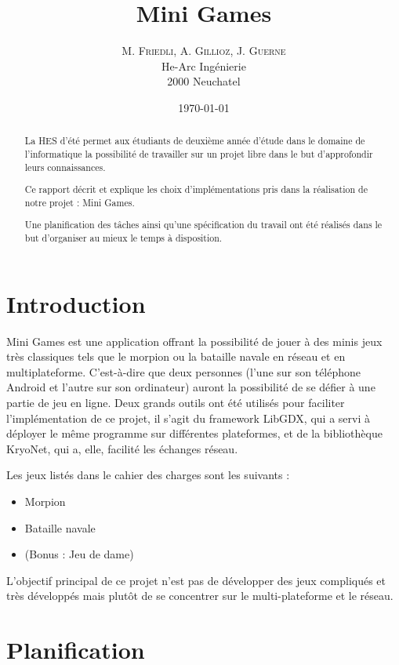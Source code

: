\documentclass{report}
\title{Mini Games}
\author{M. \textsc{Friedli}, A. \textsc{Gillioz}, J. \textsc{Guerne}\\
He-Arc Ingénierie\\
2000 Neuchatel}
\date{\today{}}
\begin{document}
\maketitle{}

\begin{abstract}
La HES d'été permet aux étudiants de deuxième année d'étude dans le domaine de l'informatique
la possibilité de travailler sur un projet libre dans le but d'approfondir leurs connaissances.

Ce rapport décrit et explique les choix d'implémentations pris dans la réalisation de notre
projet : Mini Games.

Une planification des tâches ainsi qu'une spécification du travail ont été réalisés dans le but
d'organiser au mieux le temps à disposition.
\end{abstract}
\tableofcontents

\chapter{Introduction}
Mini Games est une application offrant la possibilité de jouer à des minis jeux très classiques tels
que le morpion ou la bataille navale en réseau et en multiplateforme. C'est-à-dire que deux personnes
(l'une sur son téléphone Android et l'autre sur son ordinateur) auront la possibilité de se défier à une partie de jeu en ligne.
Deux grands outils ont été utilisés pour faciliter l'implémentation de ce projet, il s'agit du framework LibGDX, qui a servi à
déployer le même programme sur différentes plateformes, et de la bibliothèque KryoNet, qui a, elle, facilité les échanges réseau.

Les jeux listés dans le cahier des charges sont les suivants :
\begin{itemize}
	\item Morpion
	\item Bataille navale
	\item (Bonus : Jeu de dame)
\end{itemize}
L'objectif principal de ce projet n'est pas de développer des jeux compliqués et très
développés mais plutôt de se concentrer sur le multi-plateforme et le réseau.

\chapter{Planification}
\end{document}
